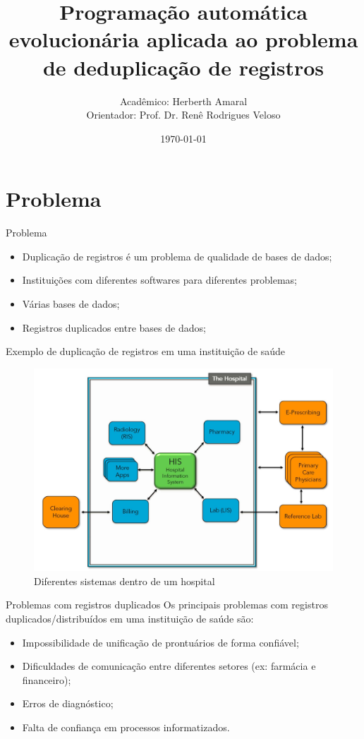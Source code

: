\documentclass{beamer}
\title{Programação automática evolucionária aplicada ao problema de deduplicação de registros}
\date{\today}
\author{Acadêmico: Herberth Amaral \\
Orientador: Prof. Dr. Renê Rodrigues Veloso}
\institute{Programa de Pós-Graduação em Modelagem Computacional e Sistemas - UNIMONTES}
\begin{document}
  \maketitle

  \section{Problema}

  \begin{frame}{Problema}
      \begin{itemize}
          \item Duplicação de registros é um problema de qualidade de bases de dados;
          \item Instituições com diferentes softwares para diferentes problemas;
          \item Várias bases de dados;
          \item Registros duplicados entre bases de dados;
      \end{itemize}
  \end{frame}

  \begin{frame}{Exemplo de duplicação de registros em uma instituição de saúde}
      \begin{figure}
          \centering
          \includegraphics[width=1.0\textwidth]{hospital.jpg}
          \caption{Diferentes sistemas dentro de um hospital \cite{hospital}}
      \end{figure}
  \end{frame}

  \begin{frame}{Problemas com registros duplicados}
      Os principais problemas com registros duplicados/distribuídos em uma instituição de saúde são:
      \begin{itemize}
          \item Impossibilidade de unificação de prontuários de forma confiável;
          \item Dificuldades de comunicação entre diferentes setores (ex: farmácia e financeiro);
          \item Erros de diagnóstico;
          \item Falta de confiança em processos informatizados.
      \end{itemize}
  \end{frame}
\end{document}
